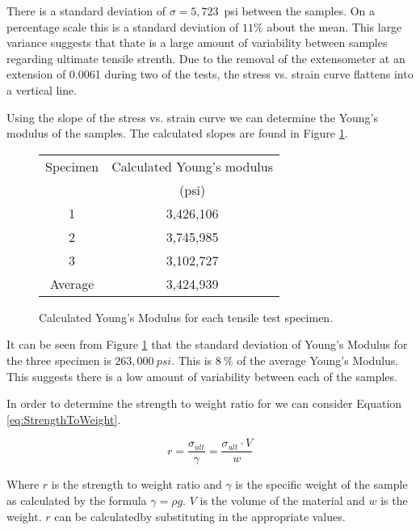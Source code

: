 \documentclass{article}
\begin{document}
There is a standard deviation of $\sigma= 5,723$~psi between the samples. On a percentage scale this is a standard deviation of $11\%$ about the mean. This large variance suggests that thate is a large amount of variability between samples regarding ultimate tensile strenth. Due to the removal of the extensometer at an extension of 0.0061 during two of the tests, the stress vs. strain curve flattens into a vertical line.

Using the slope of the stress vs. strain curve we can determine the Young's modulus of the samples. The calculated slopes are found in Figure \ref{tab:Youngs}.

\begin{figure}[H]
\begin{center}
  \begin{tabular}{|c|c|}
    \hline
    Specimen & Calculated Young's modulus \\ 
             & (psi) \\
    \hline
    1 & 3,426,106 \\
    2 & 3,745,985 \\
    3 & 3,102,727 \\
    \hline
    Average &  3,424,939 \\
    \hline
  \end{tabular}
  \caption{Calculated Young's Modulus for each tensile test specimen.}
  \label{tab:Youngs}
\end{center}
\end{figure}

It can be seen from Figure \ref{tab:Youngs} that the standard deviation of Young's Modulus for the three specimen is $263,000~psi$. This is $8~\%$ of the average Young's Modulus. This suggests there is a low amount of variability between each of the samples.

In order to determine the strength to weight ratio for we can consider Equation \ref{eq:StrengthToWeight}.

\begin{equation}
  r = \frac{\sigma_{ult}}{\gamma} = \frac{\sigma_{ult} \cdot V}{w}
  \label{eq:StrengthToWeight}
\end{equation}

Where $r$ is the strength to weight ratio and $\gamma$ is the specific weight of the sample as calculated by the formula $\gamma = \rho g$. $V$ is the volume of the material and $w$ is the weight. $r$ can be calculatedby substituting in the appropriate values.
\end{document}
